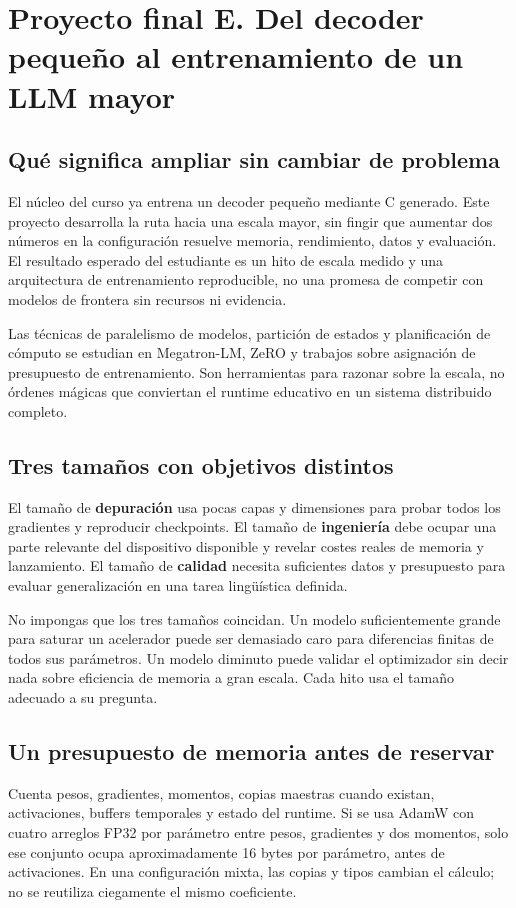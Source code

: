 \documentclass[12pt,a4paper,oneside]{report}
\begin{document}
\chapter{Proyecto final E. Del decoder pequeño al entrenamiento de un LLM mayor}
\label{project:llm}
\section{Qué significa ampliar sin cambiar de problema}
El núcleo del curso ya entrena un decoder pequeño mediante C generado. Este proyecto desarrolla la ruta hacia una escala mayor, sin fingir que aumentar dos números en la configuración resuelve memoria, rendimiento, datos y evaluación. El resultado esperado del estudiante es un hito de escala medido y una arquitectura de entrenamiento reproducible, no una promesa de competir con modelos de frontera sin recursos ni evidencia.

Las técnicas de paralelismo de modelos, partición de estados y planificación de cómputo se estudian en Megatron-LM, ZeRO y trabajos sobre asignación de presupuesto de entrenamiento. Son herramientas para razonar sobre la escala, no órdenes mágicas que conviertan el runtime educativo en un sistema distribuido completo. \cite{megatron,zero,chinchilla}

\section{Tres tamaños con objetivos distintos}
El tamaño de \textbf{depuración} usa pocas capas y dimensiones para probar todos los gradientes y reproducir checkpoints. El tamaño de \textbf{ingeniería} debe ocupar una parte relevante del dispositivo disponible y revelar costes reales de memoria y lanzamiento. El tamaño de \textbf{calidad} necesita suficientes datos y presupuesto para evaluar generalización en una tarea lingüística definida.

No impongas que los tres tamaños coincidan. Un modelo suficientemente grande para saturar un acelerador puede ser demasiado caro para diferencias finitas de todos sus parámetros. Un modelo diminuto puede validar el optimizador sin decir nada sobre eficiencia de memoria a gran escala. Cada hito usa el tamaño adecuado a su pregunta.

\section{Un presupuesto de memoria antes de reservar}
Cuenta pesos, gradientes, momentos, copias maestras cuando existan, activaciones, buffers temporales y estado del runtime. Si se usa AdamW con cuatro arreglos FP32 por parámetro entre pesos, gradientes y dos momentos, solo ese conjunto ocupa aproximadamente 16 bytes por parámetro, antes de activaciones. En una configuración mixta, las copias y tipos cambian el cálculo; no se reutiliza ciegamente el mismo coeficiente.
\end{document}
